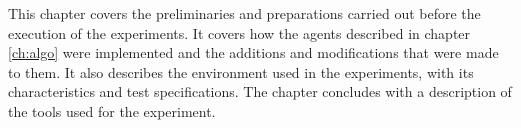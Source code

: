 This chapter covers the preliminaries and preparations carried out before the
execution of the experiments. It covers how the agents described in chapter
\ref{ch:algo} were implemented and the additions and modifications that were made to them. It also describes the environment used in the
experiments, with its characteristics and test specifications. The chapter
concludes with a description of the tools used for the experiment.
